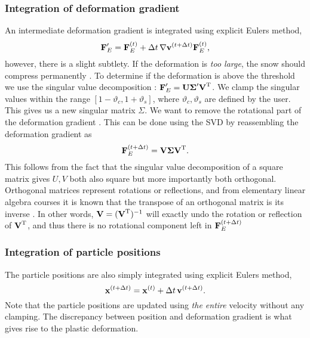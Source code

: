 \subsubsection*{Integration of deformation gradient}
An intermediate deformation gradient is integrated using explicit Eulers method,
\begin{equation}
    \Mat F'_E = \Mat F^{(t)}_E
        + \Delta t \, \nabla \vec v^{(t + \Delta t)} \Mat F^{(t)}_E
    \text,
\end{equation}
however, there is a slight subtlety.
If the deformation is {\em too large}, the snow should compress permanently
\cite{icsph}.
To determine if the deformation is above the threshold we use the
singular value decomposition
\cite{tma4145}: $\Mat F'_E = \Mat U \Mat \Sigma' \Mat V^\Tr$.
We clamp the singular values within the range
$[1 - \vartheta_c, 1+\vartheta_s]$,
where $\vartheta_c, \vartheta_s$ are defined by the user.
This gives us a new singular matrix $\Sigma$.
We want to remove the rotational part of the deformation gradient
\cite{icsph}.
This can be done using the SVD by reassembling the deformation
gradient as
\begin{equation}
    \Mat F^{(t + \Delta t)}_E = \Mat V \Mat \Sigma \Mat V^\Tr
    \text.
\end{equation}
This follows from the fact that the singular value decomposition of
a square matrix gives $U, V$ both also square but more importantly
both orthogonal\cite{citation needed}.
Orthogonal matrices represent rotations or reflections, and from
elementary linear algebra courses it is known that the transpose
of an orthogonal matrix is its inverse \cite{citation needed}.
In other words, $\Mat V = (\Mat V^\Tr)^{-1}$ will exactly undo 
the rotation or reflection of $\Mat V^\Tr$, and thus there is no
rotational component left in $\Mat F^{(t + \Delta t)}_E$

\subsubsection{Integration of particle positions}
The particle positions are also simply integrated using explicit Eulers method,
\begin{equation}
    \vec x^{(t + \Delta t)} = \vec x^{(t)} + \Delta t \, \vec v^{(t + \Delta t)}
    \text.
\end{equation}
Note that the particle positions are updated using {\em the entire}
velocity without any clamping.
The discrepancy between position and deformation gradient is what
gives rise to the plastic deformation.

